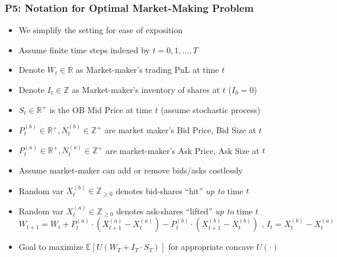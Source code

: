 \documentclass[handout]{beamer}
\begin{document}
\begin{frame}
\frametitle{P5: Notation for Optimal Market-Making Problem}
\pause
\begin{itemize}[<+->]
\item We simplify the setting for ease of exposition
\item Assume finite time steps indexed by $t= 0, 1, \ldots, T$
\item Denote $W_t \in \mathbb{R}$ as Market-maker's trading PnL at time $t$
\item Denote $I_t \in \mathbb{Z}$ as Market-maker's inventory of shares at $t$ ($I_0 = 0$)
\item $S_t \in \mathbb{R}^+$ is the OB Mid Price at time $t$ (assume stochastic process)
\item $P_t^{(b)} \in \mathbb{R}^+, N_t^{(b)} \in \mathbb{Z}^+$ are market maker's Bid Price, Bid Size at $t$
\item $P_t^{(a)} \in \mathbb{R}^+, N_t^{(a)} \in \mathbb{Z}^+$ are market-maker's Ask Price, Ask Size at $t$
\item Assume market-maker can add or remove bids/asks costlessly
\item Random var $X_t^{(b)} \in \mathbb{Z}_{\geq 0}$ denotes bid-shares ``hit'' {\em up to} time $t$
\item Random var $X_t^{(a)} \in \mathbb{Z}_{\geq 0}$ denotes ask-shares ``lifted'' {\em up to} time $t$
$$W_{t+1} = W_t + P_t^{(a)} \cdot (X_{t+1}^{(a)} - X_t^{(a)}) - P_t^{(b)} \cdot (X_{t+1}^{(b)} - X_t^{(b)}) \mbox{ , } I_t = X_t^{(b)} - X_t^{(a)}$$
\item Goal to maximize $\mathbb{E}[U(W_T + I_T \cdot S_T)]$ for appropriate concave $U(\cdot)$
\end{itemize}
\end{frame}
\end{document}
